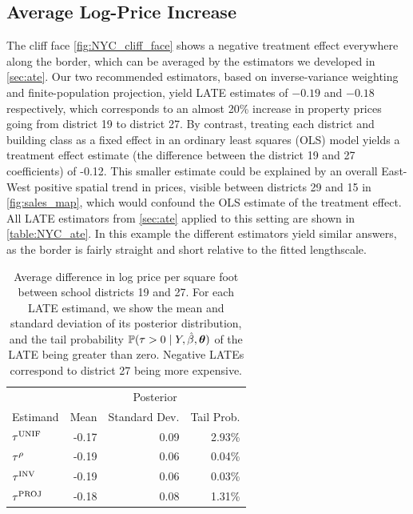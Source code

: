 \documentclass[12pt]{article}
\begin{document}
\subsection{Average Log-Price Increase}
The cliff face \autoref{fig:NYC_cliff_face} shows a negative treatment effect everywhere along the border, which can be averaged by the estimators we developed in \autoref{sec:ate}.
Our two recommended estimators, based on inverse-variance weighting and finite-population projection, yield LATE estimates of \(-0.19\) and \(-0.18\) respectively, which corresponds to an almost 20\% increase in property prices going from district 19 to district 27.
By contrast, treating each district and building class as a fixed effect in an ordinary least squares (OLS) model yields a treatment effect estimate (the difference between the district 19 and 27 coefficients) of -0.12. 
This smaller estimate could be explained by an overall East-West positive spatial trend in prices, visible between districts 29 and 15 in \autoref{fig:sales_map}, which would confound the OLS estimate of the treatment effect.
All LATE estimators from \autoref{sec:ate} applied to this setting are shown in \autoref{table:NYC_ate}.
In this example the different estimators yield similar answers, as the border is fairly straight and short relative to the fitted lengthscale.


\begin{table}
    \centering
    \begin{tabular}{lrrr}
        \hline
        & \multicolumn{3}{c}{Posterior} \\
        Estimand & Mean & Standard Dev. & Tail Prob. \\
        \hline
        \(\tau^{\mathrm{UNIF}}\) & -0.17 & 0.09 & 2.93\% \\
        \(\tau^{\rho}\)  & -0.19 & 0.06 & 0.04\% \\
        \(\tau^{\mathrm{INV}}\)  & -0.19 & 0.06 & 0.03\% \\
        \(\tau^{\mathrm{PROJ}}\) & -0.18 & 0.08 & 1.31\% \\
        \hline
    \end{tabular}
    \caption{
    \label{table:NYC_ate}
Average difference in log price per square foot between school districts 19 and 27. For each LATE estimand, we show the mean and standard deviation of its posterior distribution, and the tail probability \(\operatorname{\mathbb{P}}(\tau > 0 \mid Y, \hat{\beta}, \bm{\theta})\) of the LATE being greater than zero. Negative LATEs correspond to district 27 being more expensive.}
\end{table}
\end{document}
